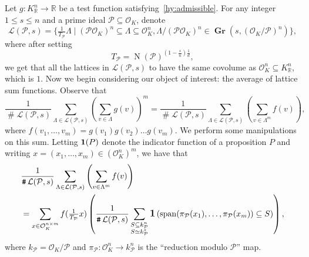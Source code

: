 \documentclass{amsart}
\theoremstyle{definition}
\theoremstyle{remark}
\newcommand{\OK}{\mathcal{O}_K}
\newcommand{\KR}{K_\mathbb{R}}
\DeclareMathOperator{\card}{\texttt{\#}}
\DeclareMathOperator{\spant}{span}
\DeclareMathOperator{\ind}{\mathlarger{\mathbf{1}}}
\DeclareMathOperator{\N}{N}
\DeclareMathOperator{\Gr}{\mathbf{Gr}}
\begin{document}
Let $g: \KR^{n} \rightarrow  \mathbb{R}$ be a test function satisfying~\cref{hy:admissible}. 
For any integer $1 \leq s \leq n$ and a prime ideal $\mathcal{P} \subseteq \OK$, denote 
\begin{equation}
    \mathcal{L}(\mathcal{P},s)
    = \{ \tfrac{1}{T_{\mathcal{P}}} \Lambda \mid (\mathcal{P} \mathcal{O}_{K})^{n} \subseteq \Lambda \subseteq \OK^{n} , \Lambda/(\mathcal{P} \OK) ^{n} \in \Gr(s,(\OK/\mathcal{P})^{n}) \},
    \label{eq:def_of_L}
\end{equation}
where after setting
\begin{equation}
    T_{\mathcal{P}} = \N(\mathcal{P})^{\left(1-\frac{s}{n} \right)\frac{1}{d}},
\end{equation}
we get that all the lattices in $\mathcal{L}(\mathcal{P},s)$ to have the same covolume as $\OK^{n} \subseteq \KR^{n}$, which is $1$.
Now we begin considering our object of interest: the average of lattice sum functions. Observe that
\begin{equation}
    \frac{1}{\card \mathcal{L}(\mathcal{P},s)}
    \sum_{ \Lambda \in \mathcal{L}(\mathcal{P},s)} 
    \left(\sum_{v \in \Lambda} g(v)\right)^{m}  = 
    \frac{1}{\card \mathcal{L}(\mathcal{P},s)} 
    \sum_{ \Lambda \in \mathcal{L}(\mathcal{P},s)} 
    \left( \sum_{v \in \Lambda^{m}} f(v)\right),
    \label{eq:nthmoment}
\end{equation}
where $f(v_1,\dots,v_m)= g(v_1)g(v_2)\dots g(v_m)$.
We perform some manipulations on this sum. 
Letting $\ind(P)$ denote the indicator function of a proposition $P$ and writing $x=(x_{1},\dots,x_{m}) \in (\OK^{n})^{m}$, we have that 
\begin{align}
& 
\frac{1}{\card \mathcal{L}(\mathcal{P},s)} \sum_{\Lambda \in \mathcal{L}(\mathcal{P},s)}\left( \sum_{v \in \Lambda^{m}} f(v)\right)  \\
& = 
\sum_{x \in \mathcal{O}_K^{n \times m} }
f(  \tfrac{1}{T_{\mathcal{P}}}  x)
\left(
    \frac{1}{\card \mathcal{L}(\mathcal{P},s)} 
    \sum_{\substack{  S \subseteq k_\mathcal{P}^{n} \\  S \simeq k_{\mathcal{P}}^{s} } } 
    \ind\left(
        \spant
        ( \pi_{\mathcal{P}}(x_1),\dots,\pi_{\mathcal{P}}(x_m)) \subseteq S
\right) \right), 
\label{eq:prepoission}
\end{align}
where $k_{\mathcal{P}} = \OK/\mathcal{P}$ and $\pi_\mathcal{P}: \OK^{n} \rightarrow  k_\mathcal{P}^{n}$ is the ``reduction modulo $\mathcal{P}$'' map. 
\end{document}
